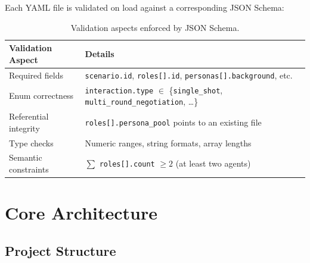 \documentclass[12pt, a4paper]{article}
\begin{document}
Each YAML file is validated on load against a corresponding JSON Schema:

\begin{table}[H]
\centering
\begin{tabularx}{\textwidth}{lX}
    \toprule
    \textbf{Validation Aspect} & \textbf{Details} \\
    \midrule
    Required fields & \texttt{scenario.id}, \texttt{roles[].id}, \texttt{personas[].background}, etc. \\
    Enum correctness & \texttt{interaction.type} $\in$ \{\texttt{single\_shot}, \texttt{multi\_round\_negotiation}, \ldots\} \\
    Referential integrity & \texttt{roles[].persona\_pool} points to an existing file \\
    Type checks & Numeric ranges, string formats, array lengths \\
    Semantic constraints & $\sum$ \texttt{roles[].count} $\geq 2$ (at least two agents) \\
    \bottomrule
\end{tabularx}
\caption{Validation aspects enforced by JSON Schema.}
\label{tab:validation}
\end{table}

\section{Core Architecture}
\label{sec:core}

\subsection{Project Structure}
\end{document}
